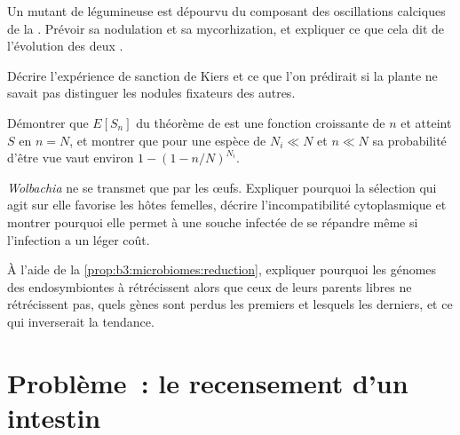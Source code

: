 \begin{exercise}[$\star\star$]\label{exo:b3:microbiomes:8}
Un mutant de légumineuse est dépourvu du composant des oscillations
calciques de la . Prévoir sa nodulation et sa
mycorhization, et expliquer ce que cela dit de l'évolution des deux
.
\end{exercise}

\begin{exercise}[$\star\star$]\label{exo:b3:microbiomes:9}
Décrire l'expérience de sanction de Kiers et ce que l'on prédirait si
la plante ne savait pas distinguer les nodules fixateurs des autres.
\end{exercise}

\begin{exercise}[$\star\star\star$]\label{exo:b3:microbiomes:10}
Démontrer que $E[S_{n}]$ du théorème de  est une fonction
croissante de $n$ et atteint $S$ en $n = N$, et montrer que pour une
espèce de $N_{i} \ll N$ et $n \ll N$ sa probabilité d'être vue vaut
environ $1 - (1 - n/N)^{N_{i}}$.
\end{exercise}

\begin{exercise}[$\star\star\star$]\label{exo:b3:microbiomes:11}
\emph{Wolbachia} ne se transmet que par les œufs. Expliquer pourquoi la
sélection qui agit sur elle favorise les hôtes femelles, décrire
l'incompatibilité cytoplasmique et montrer pourquoi elle permet à une
souche infectée de se répandre même si l'infection a un léger coût.
\end{exercise}

\begin{exercise}[$\star\star\star$]\label{exo:b3:microbiomes:12}
À l'aide de la \cref{prop:b3:microbiomes:reduction}, expliquer pourquoi
les génomes des endosymbiontes à  rétrécissent
alors que ceux de leurs parents libres ne rétrécissent pas, quels gènes
sont perdus les premiers et lesquels les derniers, et ce qui
inverserait la tendance.
\end{exercise}

\section{Problème~: le recensement d'un intestin}

